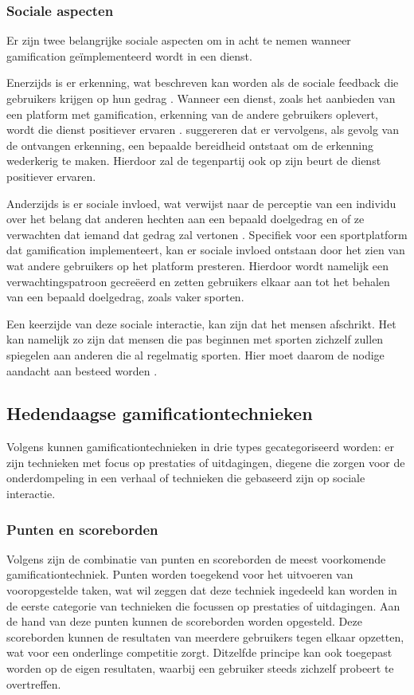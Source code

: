 \subsubsection{Sociale aspecten}
\label{ssec:sociale_aspecen}
Er zijn twee belangrijke sociale aspecten om in acht te nemen wanneer gamification geïmplementeerd wordt in een dienst.

Enerzijds is er erkenning, wat beschreven kan worden als de sociale feedback die gebruikers krijgen op hun gedrag \autocite{Cheung2011}.
Wanneer een dienst, zoals het aanbieden van een platform met gamification, erkenning van de andere gebruikers oplevert, wordt die dienst positiever ervaren \autocite{Preece2001}.
\textcite{Hamari2013} suggereren dat er vervolgens, als gevolg van de ontvangen erkenning, een bepaalde bereidheid ontstaat om de erkenning wederkerig te maken. Hierdoor zal de tegenpartij ook op zijn beurt de dienst positiever ervaren.

Anderzijds is er sociale invloed, wat verwijst naar de perceptie van een individu over het belang dat anderen hechten aan een bepaald doelgedrag en of ze verwachten dat iemand dat gedrag zal vertonen \autocite{Ajzen1991}. Specifiek voor een sportplatform dat gamification implementeert, kan er sociale invloed ontstaan door het zien van wat andere gebruikers op het platform presteren. Hierdoor wordt namelijk een verwachtingspatroon gecreëerd en zetten gebruikers elkaar aan tot het behalen van een bepaald doelgedrag, zoals vaker sporten.

Een keerzijde van deze sociale interactie, kan zijn dat het mensen afschrikt. Het kan namelijk zo zijn dat mensen die pas beginnen met sporten zichzelf zullen spiegelen aan anderen die al regelmatig sporten. Hier moet daarom de nodige aandacht aan besteed worden \autocite{Jong2010}.

\subsection{Hedendaagse gamificationtechnieken}
\label{ssec:gamificationtechnieken}
Volgens \textcite{Legaki2020} kunnen gamificationtechnieken in drie types gecategoriseerd worden: er zijn technieken met focus op prestaties of uitdagingen, diegene die zorgen voor de onderdompeling in een verhaal of technieken die gebaseerd zijn op sociale interactie.

\subsubsection{Punten en scoreborden}
\label{sssec:labels_scoreborden}
Volgens \textcite{Hamari2014} zijn de combinatie van punten en scoreborden de meest voorkomende gamificationtechniek. Punten worden toegekend voor het uitvoeren van vooropgestelde taken, wat wil zeggen dat deze techniek ingedeeld kan worden in de eerste categorie van technieken die focussen op prestaties of uitdagingen. Aan de hand van deze punten kunnen de scoreborden worden opgesteld. Deze scoreborden kunnen de resultaten van meerdere gebruikers tegen elkaar opzetten, wat voor een onderlinge competitie zorgt. Ditzelfde principe kan ook toegepast worden op de eigen resultaten, waarbij een gebruiker steeds zichzelf probeert te overtreffen.

